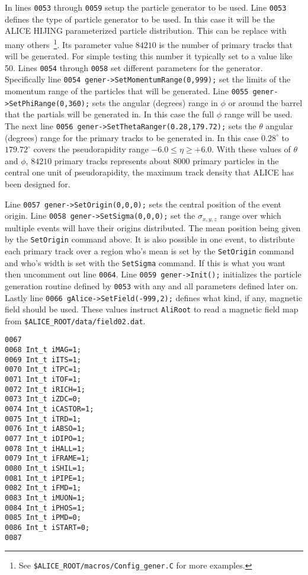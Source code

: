 In lines \texttt{0053} through \texttt{0059} setup the particle generator to be
used. Line \texttt{0053} defines the type of particle generator to be used. In
this case it will be the ALICE HIJING parameterized particle distribution. 
This can be replace with many others~\footnote{See
\texttt{\$ALICE\_ROOT/macros/Config\_gener.C} for more examples.}. Its
parameter value $84210$ is the number of primary tracks that will be
generated. For simple testing this number it typically set to a value like
50. Lines \texttt{0054} through \texttt{0058} set different parameters for the
generator. Specifically line \texttt{0054 gener->SetMomentumRange(0,999);} set
the limits of the momentum range of the particles that will be generated. Line
\texttt{0055 gener->SetPhiRange(0,360);} sets the angular (degrees) range in
$\phi$ or around the barrel that the partials will be generated in. In this
case the full $\phi$ range will be used. The next line \texttt{0056
gener->SetThetaRanger(0.28,179.72);} sets the $\theta$ angular (degrees) range
for the primary tracks to be generated in. In this case $0.28^{\circ}$ to
$179.72^{\circ}$ covers the pseudorapidity range $-6.0\leq \eta \geq
+6.0$. With these values of $\theta$ and $\phi$, $84210$ primary tracks
represents about $8000$ primary particles in the central one unit of
pseudorapidity, the maximum track density that ALICE has been designed for.

Line \texttt{0057 gener->SetOrigin(0,0,0);} sets the central position of the
event origin. Line \texttt{0058 gener->SetSigma(0,0,0);} set the
$\sigma_{x,y,z}$ range over which multiple events will have their origins
distributed. The mean position being given by the \texttt{SetOrigin} command
above. It is also possible in one event, to distribute each primary track over
a region who's mean is set by the \texttt{SetOrigin} command and who's width is
set with the \texttt{SetSigma} command. If this is what you want then uncomment
out line \texttt{0064}. Line \texttt{0059 gener->Init();} initializes the
particle generation routine defined by \texttt{0053} with any and all
parameters defined later on. Lastly line \texttt{0066
gAlice->SetField(-999,2);} defines what kind, if any, magnetic field should be
used. These values instruct \texttt{AliRoot} to read a magnetic field map from
\texttt{\$ALICE\_ROOT/data/field02.dat}.

\scriptsize
\begin{verbatim}
0067 
0068 Int_t iMAG=1;
0069 Int_t iITS=1;
0070 Int_t iTPC=1;
0071 Int_t iTOF=1;
0072 Int_t iRICH=1;
0073 Int_t iZDC=0;
0074 Int_t iCASTOR=1;
0075 Int_t iTRD=1;
0076 Int_t iABSO=1;
0077 Int_t iDIPO=1;
0078 Int_t iHALL=1;
0079 Int_t iFRAME=1;
0080 Int_t iSHIL=1;
0081 Int_t iPIPE=1;
0082 Int_t iFMD=1;
0083 Int_t iMUON=1;
0084 Int_t iPHOS=1;
0085 Int_t iPMD=0;
0086 Int_t iSTART=0;
0087 
\end{verbatim}
\normalsize

